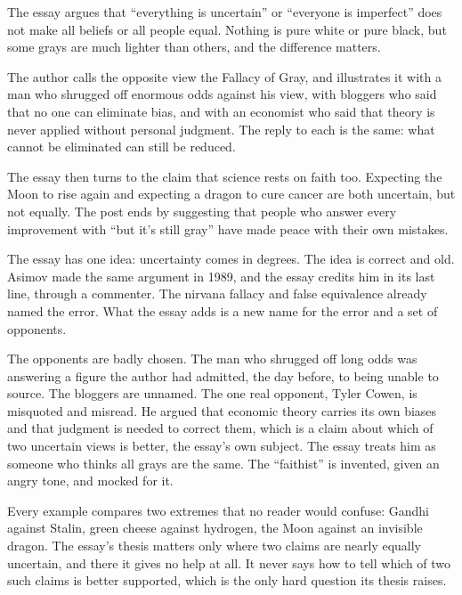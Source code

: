 \begin{afterword}
\summaryhead

The essay argues that ``everything is uncertain'' or ``everyone is imperfect'' does not make all beliefs or all people equal. Nothing is pure white or pure black, but some grays are much lighter than others, and the difference matters.

The author calls the opposite view the Fallacy of Gray, and illustrates it with a man who shrugged off enormous odds against his view, with bloggers who said that no one can eliminate bias, and with an economist who said that theory is never applied without personal judgment. The reply to each is the same: what cannot be eliminated can still be reduced.

The essay then turns to the claim that science rests on faith too. Expecting the Moon to rise again and expecting a dragon to cure cancer are both uncertain, but not equally. The post ends by suggesting that people who answer every improvement with ``but it's still gray'' have made peace with their own mistakes.

\responsehead

The essay has one idea: uncertainty comes in degrees. The idea is correct and old. Asimov made the same argument in 1989, and the essay credits him in its last line, through a commenter. The nirvana fallacy and false equivalence already named the error. What the essay adds is a new name for the error and a set of opponents.

The opponents are badly chosen. The man who shrugged off long odds was answering a figure the author had admitted, the day before, to being unable to source. The bloggers are unnamed. The one real opponent, Tyler Cowen, is misquoted and misread. He argued that economic theory carries its own biases and that judgment is needed to correct them, which is a claim about which of two uncertain views is better, the essay's own subject. The essay treats him as someone who thinks all grays are the same. The ``faithist'' is invented, given an angry tone, and mocked for it.

Every example compares two extremes that no reader would confuse: Gandhi against Stalin, green cheese against hydrogen, the Moon against an invisible dragon. The essay's thesis matters only where two claims are nearly equally uncertain, and there it gives no help at all. It never says how to tell which of two such claims is better supported, which is the only hard question its thesis raises.


\end{afterword}
